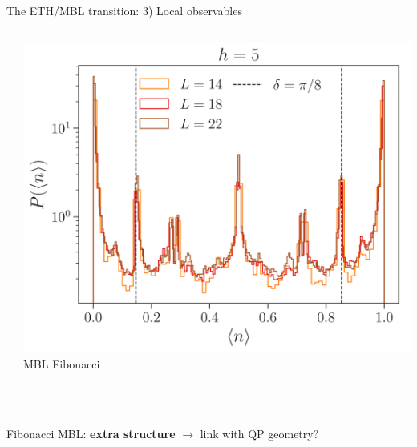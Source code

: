 \begin{frame}{The ETH/MBL transition: 3) Local observables}
\begin{columns}
\begin{column}{0.33\textwidth}
\end{column}
\begin{column}{0.33\textwidth}
\centering
\includegraphics[width=\textwidth]{img/3_Fibonacci/sz_MBL}
{\footnotesize MBL Fibonacci}
\end{column}
\end{columns}
~\\
~\\

Fibonacci MBL: \textbf{extra structure} $\to$ link with QP geometry?
\end{frame}

